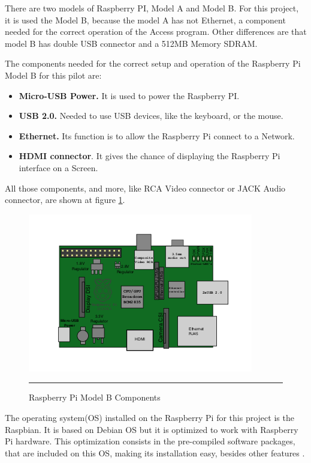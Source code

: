 \documentclass[12pt, a4paper,twoside]{tesi_upf}
\begin{document}
There are two models of Raspberry PI, Model A and Model B. For this project, it is used the Model B, because the model A has not Ethernet, a component needed for the correct operation of the Access program. Other differences are that model B has double USB connector and a 512MB Memory SDRAM.

    The components needed for the correct setup and operation of the Raspberry Pi Model B for this pilot are:
        \begin{itemize}
        \item \textbf{Micro-USB Power.} It is used to power the Raspberry PI. 
        \item \textbf{USB 2.0.} Needed to use USB devices, like the keyboard, or the mouse.
        \item \textbf{Ethernet.} Its function is to allow the Raspberry Pi connect to a Network.
        \item \textbf{HDMI connector}. It gives the chance of displaying the Raspberry Pi interface on a Screen.
        \end{itemize}
        
    All those components, and more, like RCA Video connector or JACK Audio connector, are shown at figure \ref{fig:raspelem}.
        
        \begin{figure}[htbp]
          \centering
              \includegraphics[scale=1]{./figures/Raspelem.png}
              \rule{32em}{0.7pt}
          \caption[Raspberry Pi Model B Components]{Raspberry Pi Model B Components}
          \label{fig:raspelem}
        \end{figure}
        
The operating system(OS) installed on the Raspberry Pi for this project is the Raspbian. It is based on Debian OS but it is optimized to work with Raspberry Pi hardware. This optimization consists in the pre-compiled software packages, that are included on this OS, making its installation easy, besides other features \cite{raspbian}.
        
\end{document}
